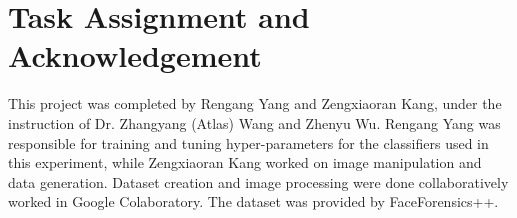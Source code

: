 \documentclass[11pt,twocolumn,letterpaper]{article}
\begin{document}
\section{Task Assignment and Acknowledgement}
This project was completed by Rengang Yang and Zengxiaoran Kang, under the instruction of Dr. Zhangyang (Atlas) Wang and Zhenyu Wu. Rengang Yang was responsible for training and tuning hyper-parameters for the classifiers used in this experiment, while Zengxiaoran Kang worked on image manipulation and data generation. Dataset creation and image processing were done collaboratively worked in Google Colaboratory. The dataset was provided by FaceForensics++. 


{\small


}
\end{document}

